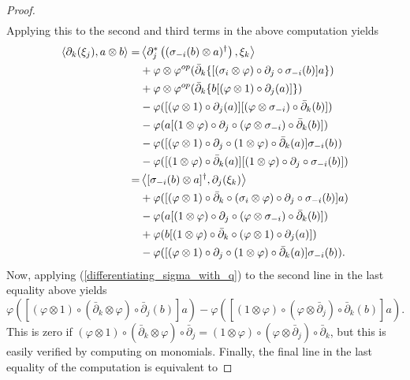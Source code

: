 \begin{proof}
\begin{align*}
	\end{align*}
Applying this to the second and third terms in the above computation yields
	\begin{align*}
		\left\langle\partial_k(\xi_j), a\otimes b\right\rangle=&\left\langle\partial_j^*\left( (\sigma_{-i}(b)\otimes a)^\dagger\right),\xi_k\right\rangle\\
							&+ \varphi\otimes\varphi^{op}( \bar{\partial}_k\{[(\sigma_{i}\otimes\varphi)\circ\partial_j\circ\sigma_{-i}(b)]a\})\\
							&+\varphi\otimes\varphi^{op}(\bar{\partial}_k\{b[(\varphi\otimes 1)\circ\partial_j(a)]\})\\
							& - \varphi( [(\varphi\otimes 1)\circ\partial_j(a)][(\varphi\otimes\sigma_{-i})\circ\bar{\partial}_k(b)])\\
							& - \varphi( a [(1\otimes \varphi)\circ\partial_j\circ(\varphi\otimes \sigma_{-i})\circ\bar{\partial}_k(b)])\\
							&-\varphi([(\varphi\otimes 1)\circ\partial_j\circ(1\otimes \varphi)\circ\bar{\partial}_k(a)]\sigma_{-i}(b))\\
							&- \varphi([(1\otimes \varphi)\circ\bar{\partial}_k(a)][(1\otimes\varphi)\circ\partial_j\circ\sigma_{-i}(b)])\\
							=& \left\langle[\sigma_{-i}(b)\otimes a]^\dagger, \partial_j(\xi_k)\right\rangle\\
							&+\varphi([(\varphi\otimes 1)\circ\bar{\partial}_k\circ(\sigma_i\otimes \varphi)\circ\partial_j\circ\sigma_{-i}(b)]a)\\
							&- \varphi( a [(1\otimes \varphi)\circ\partial_j\circ(\varphi\otimes \sigma_{-i})\circ\bar{\partial}_k(b)])\\
							&+\varphi(b[(1\otimes \varphi)\circ\bar{\partial}_k\circ(\varphi\otimes 1)\circ\partial_j(a)])\\
							&-\varphi([(\varphi\otimes 1)\circ\partial_j\circ(1\otimes \varphi)\circ\bar{\partial}_k(a)]\sigma_{-i}(b)).
	\end{align*}
Now, applying (\ref{differentiating_sigma_with_q}) to the second line in the last equality above yields
	\begin{equation*}
		\varphi([(\varphi\otimes 1)\circ(\bar{\partial}_k\otimes \varphi)\circ\bar{\partial}_j(b)]a) -\varphi( [(1\otimes \varphi)\circ(\varphi\otimes \bar{\partial}_j)\circ\bar{\partial}_k(b)]a).
	\end{equation*}
This is zero if $(\varphi\otimes 1)\circ(\bar{\partial}_k\otimes \varphi)\circ\bar{\partial}_j=(1\otimes \varphi)\circ(\varphi\otimes \bar{\partial}_j)\circ\bar{\partial}_k$, but this is easily verified by computing on monomials. Finally, the final line in the last equality of the computation is equivalent to

\end{proof}
